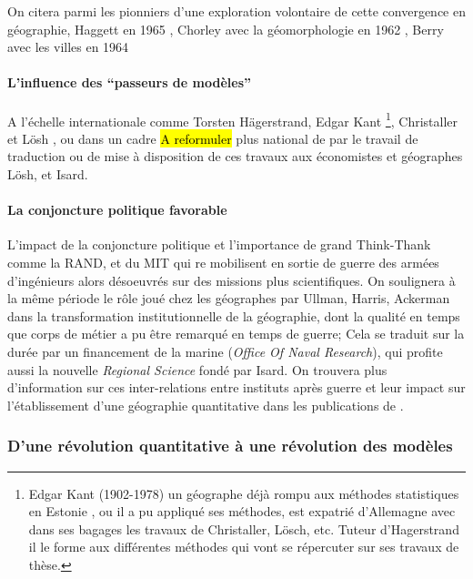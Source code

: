 On citera parmi les pionniers d'une exploration volontaire de cette convergence en géographie, Haggett en 1965 \autocite{Haggett1965}, Chorley avec la géomorphologie en 1962 \autocite{Chorley1962}, Berry avec les villes en 1964 \autocite{Berry1964}

\paragraph{L'influence des \enquote{passeurs de modèles}}

A l'échelle internationale comme Torsten Hägerstrand, Edgar Kant \footnote{Edgar Kant (1902-1978) un géographe déjà rompu aux méthodes statistiques en Estonie \autocite{Chabot1937} , ou il a pu appliqué ses méthodes, est expatrié d'Allemagne avec dans ses bagages les travaux de Christaller, Lösch, etc. Tuteur d'Hagerstrand il le forme aux différentes méthodes qui vont se répercuter sur ses travaux de thèse.}, Christaller et Lösh \autocite[119]{Berry1970}, ou dans un cadre \hl{A reformuler } plus national de par le travail de traduction ou de mise à disposition de ces travaux aux économistes et géographes Lösh, et Isard.

\paragraph{La conjoncture politique favorable}

L'impact de la conjoncture politique et l'importance de grand Think-Thank comme la RAND, et du MIT qui re mobilisent en sortie de guerre des armées d'ingénieurs alors désoeuvrés sur des missions plus scientifiques. On soulignera à la même période le rôle joué chez les géographes par Ullman, Harris, Ackerman dans la transformation institutionnelle de la géographie, dont la qualité en temps que corps de métier a pu être remarqué en temps de guerre; Cela se traduit sur la durée par un financement de la marine (\textit{Office Of Naval Research}), qui profite aussi la nouvelle \textit{Regional Science} fondé par Isard. On trouvera plus d'information sur ces inter-relations entre instituts après guerre et leur impact sur l'établissement d'une géographie quantitative dans les publications de \textcite{Barnes2006a}.

\subsubsection{D'une révolution quantitative à une révolution des modèles}
\label{ssec:revol_modele}

